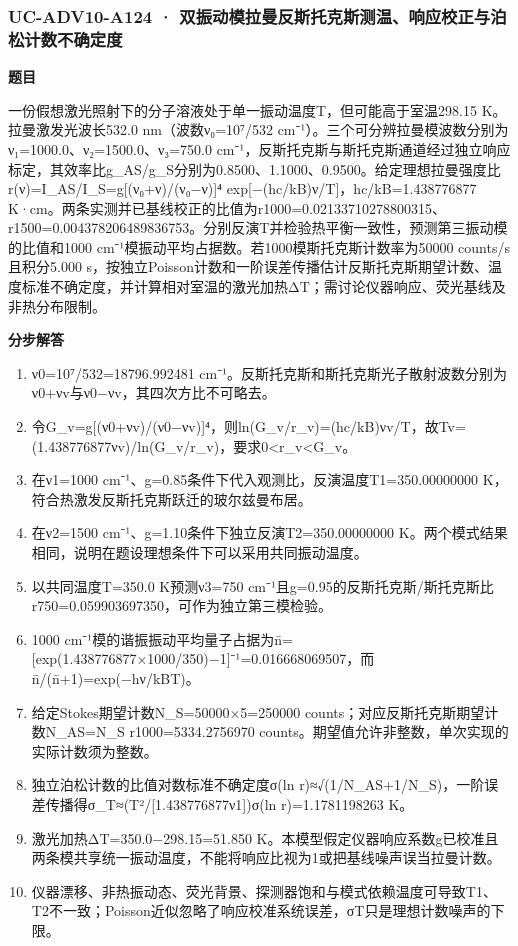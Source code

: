\documentclass[UTF8,11pt,a4paper]{ctexart}
\begin{document}
\subsubsection*{UC-ADV10-A124 · 双振动模拉曼反斯托克斯测温、响应校正与泊松计数不确定度}
\noindent\textbf{题目}\par
一份假想激光照射下的分子溶液处于单一振动温度T，但可能高于室温298.15 K。拉曼激发光波长532.0 nm（波数ν₀=10⁷/532 cm⁻¹）。三个可分辨拉曼模波数分别为ν₁=1000.0、ν₂=1500.0、ν₃=750.0 cm⁻¹，反斯托克斯与斯托克斯通道经过独立响应标定，其效率比g\_AS/g\_S分别为0.8500、1.1000、0.9500。给定理想拉曼强度比r(ν)=I\_AS/I\_S=g[(ν₀+ν)/(ν₀−ν)]⁴ exp[−(hc/kB)ν/T]，hc/kB=1.438776877 K·cm。两条实测并已基线校正的比值为r1000=0.02133710278800315、r1500=0.004378206489836753。分别反演T并检验热平衡一致性，预测第三振动模的比值和1000 cm⁻¹模振动平均占据数。若1000模斯托克斯计数率为50000 counts/s且积分5.000 s，按独立Poisson计数和一阶误差传播估计反斯托克斯期望计数、温度标准不确定度，并计算相对室温的激光加热ΔT；需讨论仪器响应、荧光基线及非热分布限制。\par
\medskip\noindent\textbf{分步解答}
\begin{enumerate}
\item ν0=10⁷/532=18796.992481 cm⁻¹。反斯托克斯和斯托克斯光子散射波数分别为ν0+νv与ν0−νv，其四次方比不可略去。
\item 令G\_v=g[(ν0+νv)/(ν0−νv)]⁴，则ln(G\_v/r\_v)=(hc/kB)νv/T，故Tv=(1.438776877νv)/ln(G\_v/r\_v)，要求0<r\_v<G\_v。
\item 在ν1=1000 cm⁻¹、g=0.85条件下代入观测比，反演温度T1=350.00000000 K，符合热激发反斯托克斯跃迁的玻尔兹曼布居。
\item 在ν2=1500 cm⁻¹、g=1.10条件下独立反演T2=350.00000000 K。两个模式结果相同，说明在题设理想条件下可以采用共同振动温度。
\item 以共同温度T=350.0 K预测ν3=750 cm⁻¹且g=0.95的反斯托克斯/斯托克斯比r750=0.059903697350，可作为独立第三模检验。
\item 1000 cm⁻¹模的谐振振动平均量子占据为n̄=[exp(1.438776877×1000/350)−1]⁻¹=0.016668069507，而n̄/(n̄+1)=exp(−hν/kBT)。
\item 给定Stokes期望计数N\_S=50000×5=250000 counts；对应反斯托克斯期望计数N\_AS=N\_S r1000=5334.2756970 counts。期望值允许非整数，单次实现的实际计数须为整数。
\item 独立泊松计数的比值对数标准不确定度σ(ln r)≈√(1/N\_AS+1/N\_S)，一阶误差传播得σ\_T≈(T²/[1.438776877ν1])σ(ln r)=1.1781198263 K。
\item 激光加热ΔT=350.0−298.15=51.850 K。本模型假定仪器响应系数g已校准且两条模共享统一振动温度，不能将响应比视为1或把基线噪声误当拉曼计数。
\item 仪器漂移、非热振动态、荧光背景、探测器饱和与模式依赖温度可导致T1、T2不一致；Poisson近似忽略了响应校准系统误差，σT只是理想计数噪声的下限。
\end{enumerate}
\end{document}
